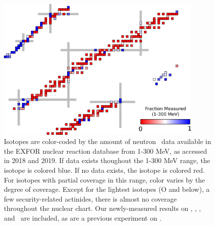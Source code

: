 \begin{figure}
    \centering
    \includegraphics[width=0.9\textwidth]{figures/TCSChart.png}
    \caption[Landscape of existing neutron \tot\ data in 2019]
    {Isotopes are color-coded by the amount of neutron \tot\ data available in the EXFOR nuclear
        reaction database from 1-300 MeV, as accessed in 2018 and 2019. If data exists thoughout the
        1-300 MeV range, the isotope
        is colored blue. If no data exists, the isotope is colored red. For
        isotopes with partial coverage in this range, color varies by the degree
        of coverage. Except for the lightest
        isotopes (O and below), a few security-related actinides, there is almost no coverage
        throughout the nuclear chart. Our newly-measured results on \oSixEight, \niEightFour,
        \rhThree, and \snTwelveFour\ are included, as are a previous experiment on
        \caAughtEight \cite{Shane2010}.
    }
    \label{TCSChart}
\end{figure}

